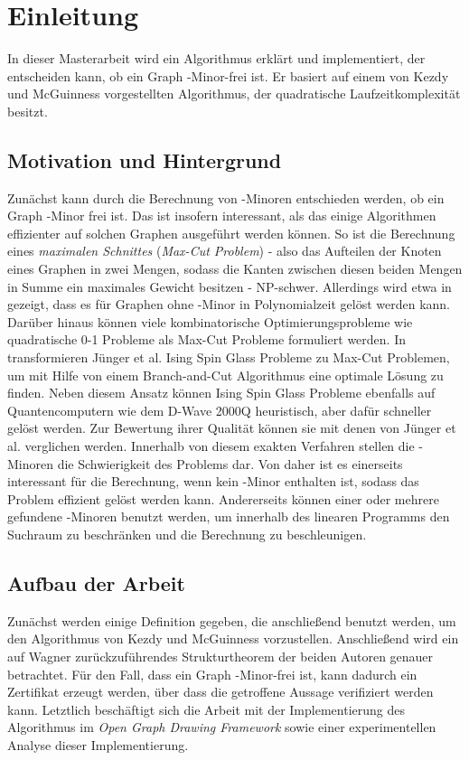 \chapter{Einleitung}
\label{cha:einleitung}

In dieser Masterarbeit wird ein Algorithmus erklärt und implementiert, der entscheiden kann, ob ein Graph \kf-Minor-frei ist.
Er basiert auf einem von Kezdy und McGuinness \cite{KeM92} vorgestellten Algorithmus, der quadratische Laufzeitkomplexität besitzt.

\section{Motivation und Hintergrund}
\label{sec:motivation_und_hintergrund}
Zunächst kann durch die Berechnung von \kf-Minoren entschieden werden, ob ein Graph \kf-Minor frei ist.
Das ist insofern interessant, als das einige Algorithmen effizienter auf solchen Graphen ausgeführt werden können.
So ist die Berechnung eines \emph{maximalen Schnittes} (\emph{Max-Cut Problem}) - also das Aufteilen der Knoten eines Graphen in zwei Mengen, sodass die Kanten zwischen diesen beiden Mengen in Summe ein maximales Gewicht besitzen - NP-schwer\cite{Kar72}.
Allerdings wird etwa in \cite{Bar83} gezeigt, dass es für Graphen ohne \kf-Minor in Polynomialzeit gelöst werden kann.
Darüber hinaus können viele kombinatorische Optimierungsprobleme wie quadratische 0-1 Probleme als Max-Cut Probleme formuliert werden\cite{BJR89}.
In \cite{JLMR+19} transformieren Jünger et al.\nolinebreak[4]\@\xspace Ising Spin Glass Probleme zu Max-Cut Problemen, um mit Hilfe von einem Branch-and-Cut Algorithmus eine optimale Lösung zu finden.
Neben diesem Ansatz können Ising Spin Glass Probleme ebenfalls auf Quantencomputern wie dem D-Wave 2000Q heuristisch, aber dafür schneller gelöst werden.
Zur Bewertung ihrer Qualität können sie mit denen von Jünger et al.\nolinebreak[4]\@\xspace verglichen werden.
Innerhalb von diesem exakten Verfahren stellen die \kf-Minoren die Schwierigkeit des Problems dar.
Von daher ist es einerseits interessant für die Berechnung, wenn kein \kf-Minor enthalten ist, sodass das Problem effizient gelöst werden kann.
Andererseits können einer oder mehrere gefundene \kf-Minoren benutzt werden, um innerhalb des linearen Programms den Suchraum zu beschränken und die Berechnung zu beschleunigen.

\section{Aufbau der Arbeit}
\label{sec:aufbau}
Zunächst werden einige Definition gegeben, die anschließend benutzt werden, um den Algorithmus von Kezdy und McGuinness vorzustellen.
Anschließend wird ein auf Wagner \cite{Wag37} zurückzuführendes Strukturtheorem der beiden Autoren genauer betrachtet.
Für den Fall, dass ein Graph \kf-Minor-frei ist, kann dadurch ein Zertifikat erzeugt werden, über dass die getroffene Aussage verifiziert werden kann.
Letztlich beschäftigt sich die Arbeit mit der Implementierung des Algorithmus im \emph{Open Graph Drawing Framework} sowie einer experimentellen Analyse dieser Implementierung.
